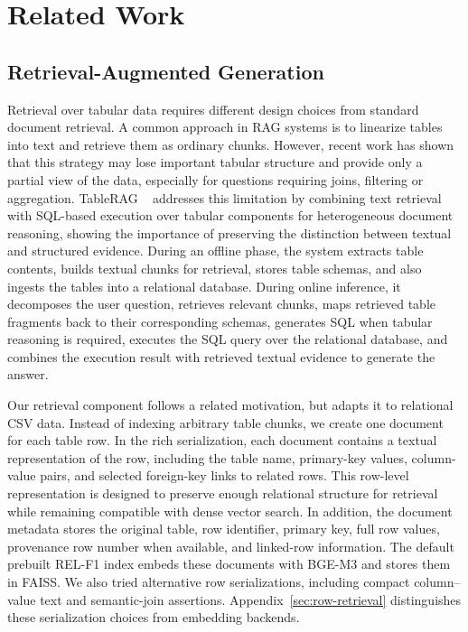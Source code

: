 \documentclass[11pt,a4paper]{article}
\begin{document}
\section{Related Work}

\subsection{Retrieval-Augmented Generation}

Retrieval over tabular data requires different design choices from standard document retrieval. A common approach in RAG systems is to linearize tables into text and retrieve them as ordinary chunks. However, recent work has shown that this strategy may lose important tabular structure and provide only a partial view of the data, especially for questions requiring joins, filtering or aggregation. TableRAG ~\cite{yu2025tableragretrievalaugmentedgeneration} addresses this limitation by combining text retrieval with SQL-based execution over tabular components for heterogeneous document reasoning, showing the importance of preserving the distinction between textual and structured evidence. During an offline phase, the system extracts table contents, builds textual chunks for retrieval, stores table schemas, and also ingests the tables into a relational database. During online inference, it decomposes the user question, retrieves relevant chunks, maps retrieved table fragments back to their corresponding schemas, generates SQL when tabular reasoning is required, executes the SQL query over the relational database, and combines the execution result with retrieved textual evidence to generate the answer.

Our retrieval component follows a related motivation, but adapts it to relational CSV data. Instead of indexing arbitrary table chunks, we create one document for each table row. In the rich serialization, each document contains a textual representation of the row, including the table name, primary-key values, column-value pairs, and selected foreign-key links to related rows. This row-level representation is designed to preserve enough relational structure for retrieval while remaining compatible with dense vector search. In addition, the document metadata stores the original table, row identifier, primary key, full row values, provenance row number when available, and linked-row information. The default prebuilt REL-F1 index embeds these documents with BGE-M3 and stores them in FAISS. We also tried alternative row serializations, including compact column--value text and semantic-join assertions. Appendix~\ref{sec:row-retrieval} distinguishes these serialization choices from embedding backends.
\end{document}
